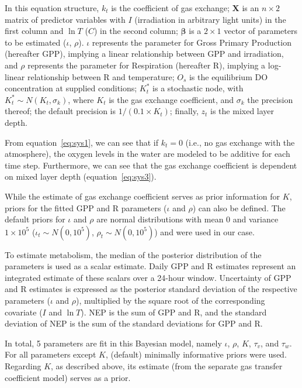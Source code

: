 \documentclass[11pt,lineno]{manuscript}\usepackage[]{graphicx}\usepackage[]{xcolor}
\begin{document}
In this equation structure, $k_{t}$ is the coefficient of gas exchange;
$\mathbf{X}$ is an $n \times 2$ matrix of predictor variables with $I$
(irradiation in arbitrary light units) in the first column and $\ln{T}$ (\textdegree{}$C$) in the second
column; $\bm{\beta}$ is a $2 \times 1$ vector of parameters to be estimated
($\iota$, $\rho$). $\iota$ represents the parameter for Gross Primary Production
(hereafter GPP), implying a linear relationship between GPP and irradiation, and $\rho$ represents
the parameter for Respiration (hereafter R), implying a log-linear relationship
between R and temperature; $O_{s}$ is the equilibrium DO concentration at
supplied conditions; $K^{\ast}_{t}$ is a stochastic node,
with $K^{\ast}_{t} \sim N(K_{t}, \sigma_{k})$, where $K_{t}$ is the gas exchange
coefficient, and $\sigma_{k}$ the precision thereof; the default precision
is $1/(0.1 \times K_{t})$; finally, $z_{t}$ is the mixed layer depth.

From equation~\ref{eq:sys1}, we can see that if $k_{t} = 0$ (i.e., no gas exchange
with the atmosphere), the oxygen levels in the water are modeled to be additive for each
time step. Furthermore, we can see that the gas exchange coefficient is dependent
on mixed layer depth (equation~\ref{eq:sys3}).

While the estimate of gas exchange coefficient serves as prior information for $K$,
priors for the fitted GPP and R parameters ($\iota$ and $\rho$) can also
be defined. The default priors for $\iota$ and $\rho$ are normal distributions
with mean 0 and variance $1 \times 10^{5}$
($\iota_{t} \sim N(0,10^{5})$, $\rho_{t} \sim N(0,10^{5})$) and were used in our case.

To estimate metabolism, the median of the posterior distribution of the parameters
is used as a scalar estimate. Daily GPP and R estimates represent an integrated
estimate of these scalars over a 24-hour window. Uncertainty of GPP and R
estimates is expressed as the posterior standard deviation of the respective
parameters ($\iota$ and $\rho$), multiplied by the square root of the corresponding
covariate ($I$ and $\ln{T}$). NEP is the sum of GPP and R, and the standard deviation
of NEP is the sum of the standard deviations for GPP and R.

In total, 5 parameters are fit in this Bayesian model, namely $\iota$, $\rho$,
$K$, $\tau_{v}$, and $\tau_{w}$. For all parameters except $K$, (default) minimally
informative priors were used. Regarding $K$, as described above, its estimate
(from the separate gas transfer coefficient model) serves as a prior.
\end{document}

